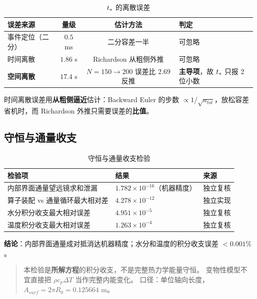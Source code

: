 \begin{table}[H]
  \centering
  \caption{$t_{*}$ 的离散误差}
  \label{tab:tstarerr}
  \footnotesize
  \begin{tabular}{@{}lccl@{}}
    \toprule
    误差来源 & 量级 & 估计方法 & 判定 \\
    \midrule
    事件定位（二分） & $0.5$ ms & 二分容差一半 & 可忽略 \\
    时间离散 & $1.86$ s & Richardson 从粗侧外推 & 可忽略 \\
    \textbf{空间离散} & $\mathbf{17.4}$ s & $N=150\to200$ 误差比 $2.69$ 反推 &
      \textbf{主导项}，故 $t_{*}$ 只报 2 位小数 \\
    \bottomrule
  \end{tabular}
\end{table}

时间离散误差用\textbf{从粗侧逼近}估计：Backward Euler 的步数
$\propto1/\sqrt{a_{tol}}$，放松容差省机时，而 Richardson 外推只需要误差的\textbf{比值}。

\subsection{守恒与通量收支}

\begin{table}[H]
  \centering
  \caption{守恒与通量收支检验}
  \label{tab:conserv}
  \footnotesize
  \begin{tabular}{@{}lll@{}}
    \toprule
    检验项 & 结果 & 来源 \\
    \midrule
    内部界面通量望远镜求和泄漏 & $1.782\times10^{-16}$（机器精度） & 独立复核 \\
    算子装配 vs 通量循环最大相对差 & $4.278\times10^{-12}$ & 独立实现 \\
    水分积分收支最大相对误差 & $4.951\times10^{-5}$ & 独立复核 \\
    温度积分收支最大相对误差 & $1.263\times10^{-4}$ & 独立复核 \\
    \bottomrule
  \end{tabular}
\end{table}

\textbf{结论}：内部界面通量成对抵消达机器精度；水分和温度的积分收支误差 $<0.001\%$。

\begin{quote}
  本检验是\textbf{所解方程}的积分收支，不是完整热力学能量守恒。
  变物性模型不宜直接把 $\rho c_p\Delta T$ 当作完整内能变化。
  口径：单位轴向长度，$A_{surf}=2\pi R_0=0.125664$ m。
\end{quote}

